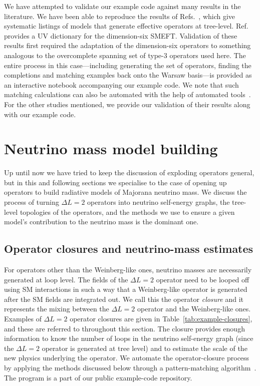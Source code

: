 We have attempted to validate our example code against many results in the
literature. We have been able to reproduce the results of
Refs.~\cite{delAguila:2012nu, Cai:2014kra, Herrero-Garcia:2016uab,
  deBlas:2017xtg, deGouvea:2019xzm}, which give systematic listings of models
that generate effective operators at tree-level. Ref.~\cite{deBlas:2017xtg}
provides a UV dictionary for the dimension-six SMEFT. Validation of these
results first required the adaptation of the dimension-six operators to
something analogous to the overcomplete spanning set of type-3 operators used
here. The entire process in this case---including generating the set of
operators, finding the completions and matching examples back onto the Warsaw
basis---is provided as an interactive notebook accompanying our example code. We
note that such matching calculations can also be automated with the help of
automated tools~\cite{Criado:2017khh, Bakshi:2018ics}. For the other studies
mentioned, we provide our validation of their results along with our example
code.

\section{Neutrino mass model building}
\label{sec:modelbuilding}

Up until now we have tried to keep the discussion of exploding operators
general, but in this and following sections we specialise to the case of opening
up operators to build radiative models of Majorana neutrino mass. We discuss the
process of turning $\Delta L = 2$ operators into neutrino self-energy graphs,
the tree-level topologies of the operators, and the methods we use to ensure a
given model's contribution to the neutrino mass is the dominant one.

\subsection{Operator closures and neutrino-mass estimates}
\label{sec:operator-closures}

For operators other than the Weinberg-like ones, neutrino masses are necessarily
generated at loop level. The fields of the $\Delta L = 2$ operator need to be
looped off using SM interactions in such a way that a Weinberg-like operator is
generated after the SM fields are integrated out. We call this the operator
\textit{closure} and it represents the mixing between the $\Delta L = 2$
operator and the Weinberg-like ones. Examples of $\Delta L = 2$ operator
closures are given in Table~\ref{tab:example-closures}, and these are referred
to throughout this section. The closure provides enough information to know the
number of loops in the neutrino self-energy graph (since the $\Delta L = 2$
operator is generated at tree level) and to estimate the scale of the new
physics underlying the operator. We automate the operator-closure process by
applying the methods discussed below through a pattern-matching
algorithm~\cite{krebber2018, krebber2017nonlinear}. The program is a part of our
public example-code repository.

